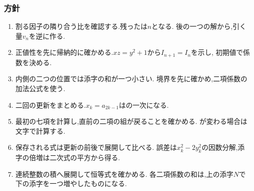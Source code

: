   \subsubsection{方針}
  \begin{enumerate}[label=\textbf{問\arabic*.},format=\bookitemlink{practice-connections}{hint}{problem}]
    \item 割る因子の隣り合う比を確認する.残ったは$n$となる.
      後の一つの解から,引く量$v_n$を逆に作る.
    \item 正値性を先に帰納的に確かめる.$xz=y^2+1$から$I_{n+1}=I_n$を示し,
      初期値で係数を決める.
    \item 内側の二つの位置では添字の和が一つ小さい.
      境界を先に確かめ,二項係数の加法公式を使う.
    \item 二回の更新をまとめる.$x_k=a_{2k-1}$はの一次になる.
    \item 最初の七項を計算し,直前の二項の組が戻ることを確かめる.
      が変わる場合は文字で計算する.
    \item 保存される式は更新の前後で展開して比べる.
      誤差は$x_k^2-2y_k^2$の因数分解,添字の倍増は二次式の平方から得る.
    \item 連続整数の積へ展開して恒等式を確かめる.
      各二項係数の和は,上の添字$N$で下の添字を一つ増やしたものになる.
  \end{enumerate}

